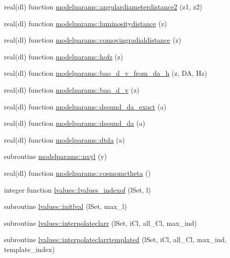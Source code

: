 \begin{DoxyCompactItemize}
real(dl) function \mbox{\hyperlink{namespacemodelparams_a74645c7e2e48bb3d57da7da5383799ed}{modelparams\+::angulardiameterdistance2}} (z1, z2)
\item 
real(dl) function \mbox{\hyperlink{namespacemodelparams_a40c5d69daf3f5689ecf0c29c19257028}{modelparams\+::luminositydistance}} (z)
\item 
real(dl) function \mbox{\hyperlink{namespacemodelparams_ad0393036efc0bf4d20eba5112748a1a2}{modelparams\+::comovingradialdistance}} (z)
\item 
real(dl) function \mbox{\hyperlink{namespacemodelparams_a0180f3c86db3b86362776831ebdb2ff2}{modelparams\+::hofz}} (z)
\item 
real(dl) function \mbox{\hyperlink{namespacemodelparams_a3a1026b2054f510f0c0dd9ee5c95e1b9}{modelparams\+::bao\+\_\+d\+\_\+v\+\_\+from\+\_\+da\+\_\+h}} (z, DA, Hz)
\item 
real(dl) function \mbox{\hyperlink{namespacemodelparams_a39160c5bd9a51624f48cbef4197bb22f}{modelparams\+::bao\+\_\+d\+\_\+v}} (z)
\item 
real(dl) function \mbox{\hyperlink{namespacemodelparams_a57d61799939e1d3d5984dba316f8cc6a}{modelparams\+::dsound\+\_\+da\+\_\+exact}} (a)
\item 
real(dl) function \mbox{\hyperlink{namespacemodelparams_a60c72460cbce332f5142d619a906fa16}{modelparams\+::dsound\+\_\+da}} (a)
\item 
real(dl) function \mbox{\hyperlink{namespacemodelparams_a0ab3d80c1ede505b3412f5b33bd3a202}{modelparams\+::dtda}} (a)
\item 
subroutine \mbox{\hyperlink{namespacemodelparams_af7cba6b22f91f9428ebecb63823d451a}{modelparams\+::nxyl}} (y)
\item 
real(dl) function \mbox{\hyperlink{namespacemodelparams_ab4a4cc860939dbbdc0236048b5f9457e}{modelparams\+::cosmomctheta}} ()
\item 
integer function \mbox{\hyperlink{namespacelvalues_ae29d1934474229125b75e4a609f4e81e}{lvalues\+::lvalues\+\_\+indexof}} (l\+Set, l)
\item 
subroutine \mbox{\hyperlink{namespacelvalues_aae4ab5512d16abd3d2f2857fe806e012}{lvalues\+::initlval}} (l\+Set, max\+\_\+l)
\item 
subroutine \mbox{\hyperlink{namespacelvalues_a62105cb97d67654d96481cbb8fe54240}{lvalues\+::interpolateclarr}} (l\+Set, i\+Cl, all\+\_\+\+Cl, max\+\_\+ind)
\item 
subroutine \mbox{\hyperlink{namespacelvalues_a0aa80e0b1f26674e19df96ec0d9c199e}{lvalues\+::interpolateclarrtemplated}} (l\+Set, i\+Cl, all\+\_\+\+Cl, max\+\_\+ind, template\+\_\+index)

\end{DoxyCompactItemize}
